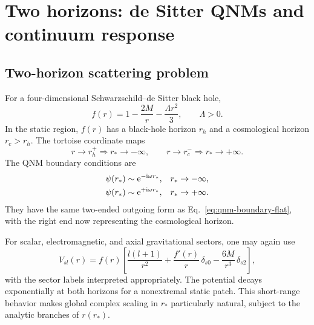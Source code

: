 \section{Two horizons: de Sitter QNMs and continuum response}
\label{sec:bh-desitter}

\subsection{Two-horizon scattering problem}
\label{subsec:sds-setup}

For a four-dimensional Schwarzschild--de Sitter black hole,
\begin{equation}
  f(r)=1-\frac{2M}{r}-\frac{\Lambda r^2}{3},
  \qquad \Lambda>0 .
  \label{eq:sds-f}
\end{equation}
In the static region, $f(r)$ has a black-hole horizon $r_h$ and a cosmological
horizon $r_c>r_h$.  The tortoise coordinate maps
\begin{equation}
  r\to r_h^+\Longrightarrow r_*\to-\infty,
  \qquad
  r\to r_c^-\Longrightarrow r_*\to+\infty .
  \label{eq:sds-tortoise-limits}
\end{equation}
The QNM boundary conditions are
\begin{align}
  \psi(r_*)&\sim\mathrm{e}^{-\mathrm{i}\omega r_*},
  &&r_*\to-\infty,
  \notag\\
  \psi(r_*)&\sim\mathrm{e}^{+\mathrm{i}\omega r_*},
  &&r_*\to+\infty .
  \label{eq:sds-boundary}
\end{align}
They have the same two-ended outgoing form as Eq.~\eqref{eq:qnm-boundary-flat},
with the right end now representing the cosmological horizon.

For scalar, electromagnetic, and axial gravitational sectors, one may again
use
\begin{equation}
  V_{sl}(r)
  =f(r)\left[
  \frac{l(l+1)}{r^2}
  +\frac{f'(r)}{r}\,\delta_{s0}
  -\frac{6M}{r^3}\,\delta_{s2}
  \right] ,
  \label{eq:sds-potentials}
\end{equation}
with the sector labels interpreted appropriately.  The potential decays
exponentially at both horizons for a nonextremal static patch.  This
short-range behavior makes global complex scaling in $r_*$ particularly
natural, subject to the analytic branches of $r(r_*)$.

